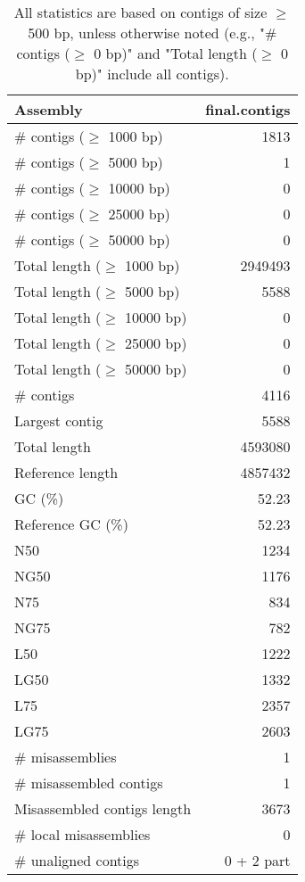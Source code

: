 \documentclass[12pt,a4paper]{article}
\begin{document}
\begin{table}[ht]
\begin{center}
\caption{All statistics are based on contigs of size $\geq$ 500 bp, unless otherwise noted (e.g., "\# contigs ($\geq$ 0 bp)" and "Total length ($\geq$ 0 bp)" include all contigs).}
\begin{tabular}{|l*{1}{|r}|}
\hline
Assembly & final.contigs \\ \hline
\# contigs ($\geq$ 1000 bp) & 1813 \\ \hline
\# contigs ($\geq$ 5000 bp) & 1 \\ \hline
\# contigs ($\geq$ 10000 bp) & 0 \\ \hline
\# contigs ($\geq$ 25000 bp) & 0 \\ \hline
\# contigs ($\geq$ 50000 bp) & 0 \\ \hline
Total length ($\geq$ 1000 bp) & 2949493 \\ \hline
Total length ($\geq$ 5000 bp) & 5588 \\ \hline
Total length ($\geq$ 10000 bp) & 0 \\ \hline
Total length ($\geq$ 25000 bp) & 0 \\ \hline
Total length ($\geq$ 50000 bp) & 0 \\ \hline
\# contigs & 4116 \\ \hline
Largest contig & 5588 \\ \hline
Total length & 4593080 \\ \hline
Reference length & 4857432 \\ \hline
GC (\%) & 52.23 \\ \hline
Reference GC (\%) & 52.23 \\ \hline
N50 & 1234 \\ \hline
NG50 & 1176 \\ \hline
N75 & 834 \\ \hline
NG75 & 782 \\ \hline
L50 & 1222 \\ \hline
LG50 & 1332 \\ \hline
L75 & 2357 \\ \hline
LG75 & 2603 \\ \hline
\# misassemblies & 1 \\ \hline
\# misassembled contigs & 1 \\ \hline
Misassembled contigs length & 3673 \\ \hline
\# local misassemblies & 0 \\ \hline
\# unaligned contigs & 0 + 2 part \\ \hline

\end{tabular}
\end{center}
\end{table}
\end{document}

